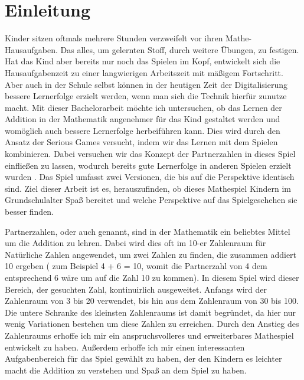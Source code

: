 
\chapter{Einleitung}
Kinder sitzen oftmals mehrere Stunden verzweifelt vor ihren Mathe-Hausaufgaben. Das alles, um gelernten Stoff, durch weitere Übungen, zu festigen. Hat das Kind aber bereits nur noch das Spielen im Kopf, entwickelt sich die Hausaufgabenzeit zu einer langwierigen Arbeitszeit mit mäßigem Fortschritt. Aber auch in der Schule selbst können in der heutigen Zeit der Digitalisierung bessere Lernerfolge erzielt werden, wenn man sich die Technik hierfür zunutze macht. Mit dieser Bachelorarbeit möchte ich untersuchen, ob das Lernen der Addition in der Mathematik angenehmer für das Kind gestaltet werden und womöglich auch bessere Lernerfolge herbeiführen kann. Dies wird durch den Ansatz der Serious Games versucht, indem wir das Lernen mit dem Spielen kombinieren. Dabei versuchen wir das Konzept der Partnerzahlen in dieses Spiel einfließen zu lassen, wodurch bereits gute Lernerfolge in anderen Spielen erzielt wurden \cite{Jung2016}. Das Spiel umfasst zwei Versionen, die bis auf die Perspektive identisch sind. Ziel dieser Arbeit ist es, herauszufinden, ob dieses Mathespiel Kindern im Grundschulalter Spaß bereitet und welche Perspektive auf das Spielgeschehen sie besser finden.

Partnerzahlen, oder auch  genannt, sind in der Mathematik ein beliebtes Mittel um die Addition zu lehren. Dabei wird dies oft im 10-er Zahlenraum für Natürliche Zahlen angewendet, um zwei Zahlen zu finden, die zusammen addiert 10 ergeben ( zum Beispiel 4 + 6 = 10, womit die Partnerzahl von 4 dem entsprechend 6 wäre um auf die Zahl 10 zu kommen). In diesem Spiel wird dieser Bereich, der gesuchten Zahl, kontinuirlich ausgeweitet. Anfangs wird der Zahlenraum von 3 bis 20 verwendet, bis hin aus dem Zahlenraum von 30 bis 100. Die untere Schranke des kleinsten Zahlenraums ist damit begründet, da hier nur wenig Variationen bestehen um diese Zahlen zu erreichen. Durch den Anstieg des Zahlenraums erhoffe ich mir ein anspruchsvolleres und erweiterbares Mathespiel entwickelt zu haben. Außerdem erhoffe ich mir einen interessanten Aufgabenbereich für das Spiel gewählt zu haben, der den Kindern es leichter macht die Addition zu verstehen und Spaß an dem Spiel zu haben.

